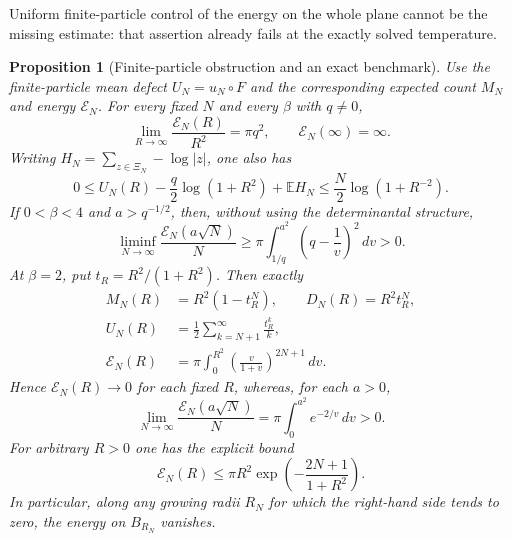 \documentclass[11pt,a4paper]{article}
\numberwithin{equation}{section}
\newtheorem{proposition}[theorem]{Proposition}
\theoremstyle{definition}
\theoremstyle{remark}
\begin{document}
Uniform finite-particle control of the energy on the whole plane
cannot be the missing estimate: that assertion already fails at
the exactly solved temperature.

\begin{proposition}[Finite-particle obstruction and an exact benchmark]
\label{prop:screening-finite-particle-energy-escape}
Use the finite-particle mean defect $U_N=u_N\circ F$ and the
corresponding expected count $M_N$ and energy $\mathcal E_N$.
For every fixed $N$ and every $\beta$ with $q\ne0$,
\begin{equation}
 \lim_{R\to\infty}\frac{\mathcal E_N(R)}{R^2}=\pi q^2,
 \qquad \mathcal E_N(\infty)=\infty.
 \label{eq:screening-finite-n-infinite-energy}
\end{equation}
Writing $H_N=\sum_{z\in\Xi_N}-\log|z|$, one also has
\begin{equation}
 0\le U_N(R)-\frac q2\log(1+R^2)+\mathbb EH_N
       \le\frac N2\log(1+R^{-2}).
 \label{eq:screening-finite-n-mean-boundary}
\end{equation}
If $0<\beta<4$ and $a>q^{-1/2}$, then, without using the
determinantal structure,
\begin{equation}
 \liminf_{N\to\infty}\frac{\mathcal E_N(a\sqrt N)}N
 \ge\pi\int_{1/q}^{a^2}\left(q-\frac1v\right)^2\,dv>0.
 \label{eq:screening-all-beta-mesoscopic-lower}
\end{equation}
At $\beta=2$, put $t_R=R^2/(1+R^2)$.  Then exactly
\begin{align}
 M_N(R)&=R^2(1-t_R^N),\qquad D_N(R)=R^2t_R^N,
 \label{eq:screening-beta2-count-discrepancy}\\
 U_N(R)&=\frac12\sum_{k=N+1}^\infty\frac{t_R^k}{k},
 \label{eq:screening-beta2-potential}\\
 \mathcal E_N(R)&=\pi\int_0^{R^2}
             \left(\frac v{1+v}\right)^{2N+1}\,dv.
 \label{eq:screening-beta2-energy}
\end{align}
Hence $\mathcal E_N(R)\to0$ for each fixed $R$, whereas, for each
$a>0$,
\begin{equation}
 \lim_{N\to\infty}\frac{\mathcal E_N(a\sqrt N)}N
       =\pi\int_0^{a^2}e^{-2/v}\,dv>0.
 \label{eq:screening-beta2-mesoscopic-energy}
\end{equation}
For arbitrary $R>0$ one has the explicit bound
\begin{equation}
 \mathcal E_N(R)\le\pi R^2
       \exp\left(-\frac{2N+1}{1+R^2}\right).
 \label{eq:screening-beta2-growing-cutoff}
\end{equation}
In particular, along any growing radii $R_N$ for which the
right-hand side tends to zero, the energy on $B_{R_N}$ vanishes.
\end{proposition}
\end{document}
